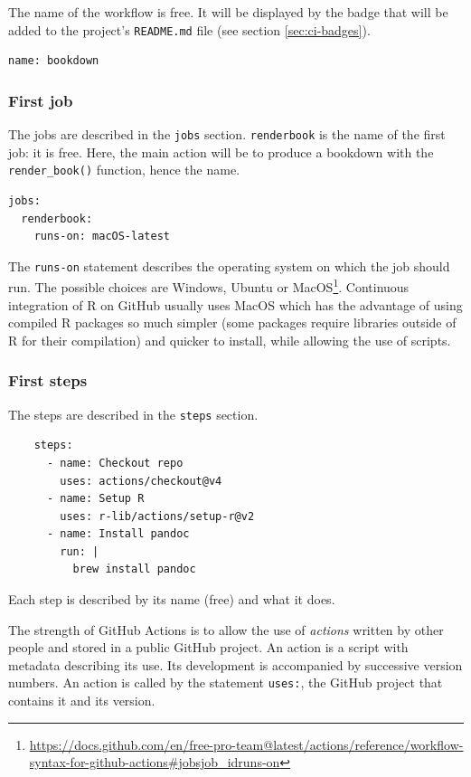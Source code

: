 \documentclass[
  12pt,
  american,
  a4paper,
  extrafontsizes,onecolumn,openright
  ]{memoir}
\begin{document}
The name of the workflow is free.
It will be displayed by the badge that will be added to the project's \texttt{README.md} file (see section \ref{sec:ci-badges}).

\begin{verbatim}
name: bookdown
\end{verbatim}

\subsubsection{First job}\label{first-job}

The jobs are described in the \texttt{jobs} section.
\texttt{renderbook} is the name of the first job: it is free.
Here, the main action will be to produce a bookdown with the \texttt{render\_book()} function, hence the name.

\begin{verbatim}
jobs:
  renderbook:
    runs-on: macOS-latest
\end{verbatim}

The \texttt{runs-on} statement describes the operating system on which the job should run.
The possible choices are Windows, Ubuntu or MacOS\footnote{\url{https://docs.github.com/en/free-pro-team@latest/actions/reference/workflow-syntax-for-github-actions\#jobsjob_idruns-on}}.
Continuous integration of R on GitHub usually uses MacOS which has the advantage of using compiled R packages so much simpler (some packages require libraries outside of R for their compilation) and quicker to install, while allowing the use of scripts.

\subsubsection{First steps}\label{first-steps}

The steps are described in the \texttt{steps} section.

\begin{verbatim}
    steps:
      - name: Checkout repo
        uses: actions/checkout@v4
      - name: Setup R
        uses: r-lib/actions/setup-r@v2
      - name: Install pandoc
        run: |
          brew install pandoc
\end{verbatim}

Each step is described by its name (free) and what it does.

The strength of GitHub Actions is to allow the use of \emph{actions} written by other people and stored in a public GitHub project.
An action is a script with metadata describing its use.
Its development is accompanied by successive version numbers.
An action is called by the statement \texttt{uses:}, the GitHub project that contains it and its version.
\end{document}
